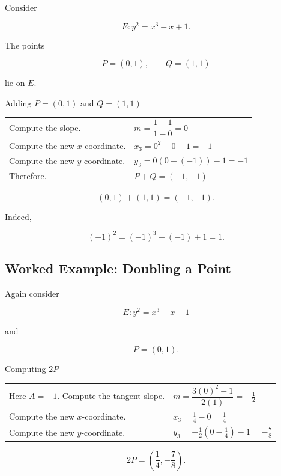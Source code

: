 Consider

\[ E:y^2=x^3-x+1. \]

The points

\[ P=(0,1),\qquad Q=(1,1) \]

lie on \(E\).

\begin{workedexamplebox}{Adding \(P=(0,1)\) and \(Q=(1,1)\)}

\begin{tabularx}{\textwidth}{@{}>{\raggedright\arraybackslash}p{}X@{}}
Compute the slope. &
\(m=\dfrac{1-1}{1-0}=0\)\\
Compute the new \(x\)-coordinate. &
\(x_3=0^2-0-1=-1\)\\
Compute the new \(y\)-coordinate. &
\(y_3=0(0-(-1))-1=-1\)\\
Therefore. &
\(P+Q=(-1,-1)\)
\end{tabularx}

\begin{answerbox}
\[ \boxed{(0,1)+(1,1)=(-1,-1).} \]
\end{answerbox}
\end{workedexamplebox}

Indeed,

\[ (-1)^2=(-1)^3-(-1)+1=1. \]

\subsection{Worked Example: Doubling a Point}
\label{subsec:worked-elliptic-doubling}

Again consider

\[ E:y^2=x^3-x+1 \]

and

\[ P=(0,1). \]

\begin{workedexamplebox}{Computing \(2P\)}

\begin{tabularx}{\textwidth}{@{}>{\raggedright\arraybackslash}p{}X@{}}
Here \(A=-1\). Compute the tangent slope. &
\(m=\dfrac{3(0)^2-1}{2(1)}=-\frac12\)\\
Compute the new \(x\)-coordinate. &
\(x_3=\frac14-0=\frac14\)\\
Compute the new \(y\)-coordinate. &
\(y_3=-\frac12(0-\frac14)-1=-\frac78\)
\end{tabularx}

\begin{answerbox}
\[ \boxed{2P=\left(\frac14,-\frac78\right).} \]
\end{answerbox}
\end{workedexamplebox}

